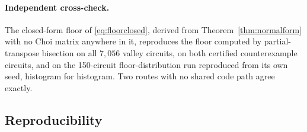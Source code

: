 \documentclass[11pt,a4paper]{article}
\theoremstyle{definition}
\theoremstyle{remark}
\begin{document}
\paragraph{Independent cross-check.} The closed-form floor of \eqref{eq:floorclosed}, derived from Theorem~\ref{thm:normalform} with no Choi matrix anywhere in it, reproduces the floor computed by partial-transpose bisection on all $7{,}056$ valley circuits, on both certified counterexample circuits, and on the 150-circuit floor-distribution run reproduced from its own seed, histogram for histogram. Two routes with no shared code path agree exactly.

\subsection{Reproducibility}
\end{document}
